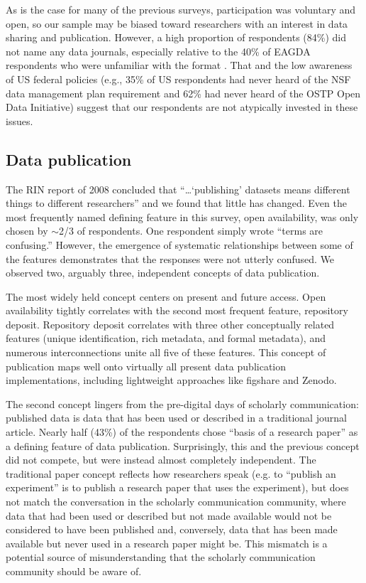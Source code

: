 \documentclass[10pt]{article}
\begin{document}
As is the case for many of the previous surveys, participation was voluntary and open, so our sample may be biased toward researchers with an interest in data sharing and publication.
However, a high proportion of respondents (84\%) did not name any data journals, especially relative to the 40\% of EAGDA respondents who were unfamiliar with the format \cite{bobrow_establishing_2014}.
That and the low awareness of US federal policies (e.g., 35\% of US respondents had never heard of the NSF data management plan requirement and 62\% had never heard of the OSTP Open Data Initiative) suggest that our respondents are not atypically invested in these issues.

\subsection*{Data publication}

The RIN report of 2008 concluded that ``\ldots`publishing' datasets means different things to different researchers'' \cite{swan_share_2008} and we found that little has changed.
Even the most frequently named defining feature in this survey, open availability, was only chosen by $\sim$2/3 of respondents.
One respondent simply wrote ``terms are confusing.''
However, the emergence of systematic relationships between some of the features demonstrates that the responses were not utterly confused.
We observed two, arguably three, independent concepts of data publication.

The most widely held concept centers on present and future access.
Open availability tightly correlates with the second most frequent feature, repository deposit.
Repository deposit correlates with three other conceptually related features (unique identification, rich metadata, and formal metadata), and numerous interconnections unite all five of these features.
This concept of publication maps well onto virtually all present data publication implementations, including lightweight approaches like figshare and Zenodo.

The second concept lingers from the pre-digital days of scholarly communication: published data is data that has been used or described in a traditional journal article. 
Nearly half (43\%) of the respondents chose ``basis of a research paper'' as a defining feature of data publication. 
Surprisingly, this and the previous concept did not compete, but were instead almost completely independent.
The traditional paper concept reflects how researchers speak (e.g. to ``publish an experiment'' is to publish a research paper that uses the experiment), but does not match the conversation in the scholarly communication community, where data that had been used or described but not made available would not be considered to have been published and, conversely, data that has been made available but never used in a research paper might be.
This mismatch is a potential source of misunderstanding that the scholarly communication community should be aware of.
\end{document}

